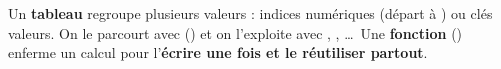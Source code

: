 \begin{aretenir}
Un \textbf{tableau} regroupe plusieurs valeurs : indices numériques (départ à
) ou clés \code{=>} valeurs. On le parcourt avec 
() et on l'exploite avec , ,
\dots\ Une \textbf{fonction} () enferme un calcul pour l'\textbf{écrire une fois et le réutiliser
partout}.
\end{aretenir}
